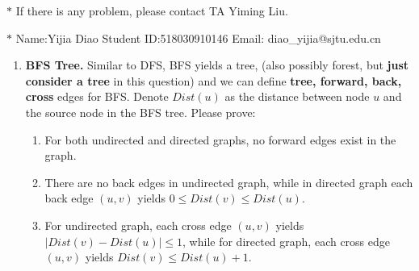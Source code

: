 \documentclass[12pt,a4paper]{article}
\theoremstyle{definition}
\begin{document}
\noindent

\noindent{}
\begin{center}
\footnotesize{\color{red}$*$ If there is any problem, please contact TA Yiming Liu.}

\footnotesize{\color{blue}$*$ Name:Yijia Diao  \quad Student ID:518030910146 \quad Email: diao\_yijia@sjtu.edu.cn}
\end{center}

\begin{enumerate}
    \item
    \textbf{BFS Tree.} Similar to DFS, BFS yields a tree, (also possibly forest, but \textbf{just consider a tree} in this question) and we can define \textbf{tree, forward, back, cross} edges for BFS. Denote $Dist(u)$ as the distance between node $u$ and the source node in the BFS tree. Please prove:
    \begin{enumerate}
    	\item For both undirected and directed graphs, no forward edges exist in the graph.
    	
    	\item There are no back edges in undirected graph, while in directed graph each back edge $(u,v)$ yields $0\leq Dist(v)\leq Dist(u)$.
    	
    	\item For undirected graph, each cross edge $(u,v)$ yields $|Dist(v)-Dist(u)|\le 1$, while for directed graph, each cross edge $(u,v)$ yields $Dist(v)\leq Dist(u)+1$.
    	
    \end{enumerate}
    

\end{enumerate}
\end{document}
